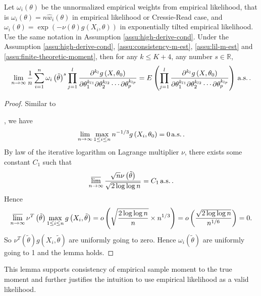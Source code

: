 \begin{lem}
\label{lem:finite-empirical weight moment}Let $\omega_{i}\left(\theta\right)$
be the unnormalized empirical weights from empirical likelihood, that
is $\omega_{i}\left(\theta\right)=n\hat{w}_{i}\left(\theta\right)$
in empirical likelihood or Cressie-Read case, and $\omega_{i}\left(\theta\right)=\exp\left(-\nu\left(\theta\right)g\left(X_{i},\theta\right)\right)$
in exponentially tilted empirical likelihood. Use the same notation
in Assumption \ref{assu:high-derive-cond}. Under the Assumption \ref{assu:high-derive-cond},
\ref{assu:consistency-m-est}, \ref{assu:lil-m-est} and \ref{assu:finite-theoretic-moment},
then for any $k\le K+4$, any number $s\in\mathbb{R}$, 
\[
\lim_{n\rightarrow\infty}\frac{1}{n}\sum_{i=1}^{n}\omega_{i}\left(\tilde{\theta}\right)^{s}\prod_{j=1}^{l}\frac{\partial^{k_{l}}g\left(X,\theta_{0}\right)}{\partial\theta_{1}^{k_{l1}}\partial\theta_{2}^{k_{l2}}\cdots\partial\theta_{p}^{k_{lp}}}=E\left(\prod_{j=1}^{l}\frac{\partial^{k_{l}}g\left(X,\theta_{0}\right)}{\partial\theta_{1}^{k_{l1}}\partial\theta_{2}^{k_{l2}}\cdots\partial\theta_{p}^{k_{lp}}}\right)\,\mathrm{a.s.}\,.
\]
\end{lem}
\begin{proof}
Similar to%
\begin{comment}
add detail lemma number
\end{comment}
{} \citet{owen2010empirical}, we have 
\[
\lim_{n\rightarrow\infty}\max_{1\le i\le n}n^{-1/3}g\left(X_{i},\theta_{0}\right)=0\,\mathrm{a.s.}\,.
\]
By law of the iterative logarithm on Lagrange multiplier $\nu$, there
exists some constant $C_{1}$ such that 
\[
\varlimsup_{n\rightarrow\infty}\frac{\sqrt{n}\nu\left(\tilde{\theta}\right)}{\sqrt{2\log\log n}}=C_{1}\,\mathrm{a.s.}\,.
\]
Hence 
\[
\varlimsup_{n\rightarrow\infty}\nu^{T}\left(\tilde{\theta}\right)\max_{1\le i\le n}g\left(X_{i},\tilde{\theta}\right)=o\left(\sqrt{\frac{2\log\log n}{n}}\times n^{1/3}\right)=o\left(\frac{\sqrt{2\log\log n}}{n^{1/6}}\right)=0.
\]
So $\nu^{T}\left(\tilde{\theta}\right)g\left(X_{i},\tilde{\theta}\right)$
are uniformly going to zero. Hence $\omega_{i}\left(\tilde{\theta}\right)$
are uniformly going to 1 and the lemma holds.
\end{proof}
This lemma supports consistency of empirical sample moment to the true
moment and further justifies the intuition to use empirical likelihood
as a valid likelihood. 

